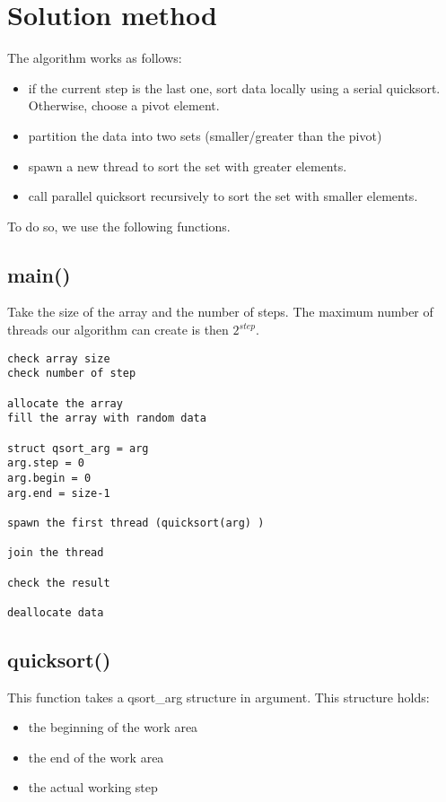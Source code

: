 \chapter{Solution method}

The algorithm works as follows:
\begin{itemize}
	\item if the current step is the last one, sort data locally using a serial quicksort. Otherwise, choose a pivot element.
	\item partition the data into two sets (smaller/greater than the pivot)
	\item spawn a new thread to sort the set with greater elements.
	\item call parallel quicksort recursively to sort the set with smaller elements.
\end{itemize}

To do so, we use the following functions.

\section{main()}

Take the size of the array and the number of steps. The maximum number of threads our algorithm can create is then $2^{step}$.

\begin{verbatim}
check array size
check number of step

allocate the array
fill the array with random data

struct qsort_arg = arg
arg.step = 0
arg.begin = 0
arg.end = size-1

spawn the first thread (quicksort(arg) )

join the thread

check the result

deallocate data
\end{verbatim}

\section{quicksort()}

This function takes a qsort\_arg structure in argument. This structure holds:
\begin{itemize}
  \item the beginning of the work area
  \item the end of the work area
  \item the actual working step
\end{itemize}


